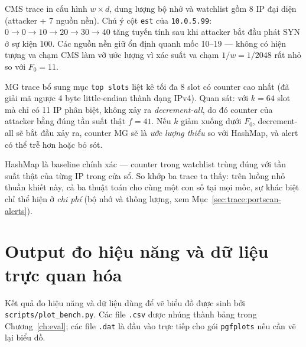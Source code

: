 \noindent CMS trace in cấu hình $w \times d$, dung lượng bộ nhớ và watchlist
gồm 8 IP đại diện (attacker + 7 nguồn nền). Chú ý cột \texttt{est} của
\texttt{10.0.5.99}: $0 \to 0 \to 10 \to 20 \to 30 \to 40$ tăng tuyến tính
sau khi attacker bắt đầu phát SYN ở sự kiện 100. Các nguồn nền giữ ổn định
quanh mốc 10--19 --- không có hiện tượng va chạm CMS làm vỡ ước lượng vì
xác suất va chạm $1/w = 1/2048$ rất nhỏ so với $F_0 = 11$.



\noindent MG trace bổ sung mục \texttt{top slots} liệt kê tối đa 8 slot có
counter cao nhất (đã giải mã ngược 4 byte little-endian thành dạng IPv4).
Quan sát: với $k = 64$ slot mà chỉ có 11 IP phân biệt, không xảy ra
\emph{decrement-all}, do đó counter của attacker bằng đúng tần suất thật
$f = 41$. Nếu $k$ giảm xuống dưới $F_0$, decrement-all sẽ bắt đầu xảy ra,
counter MG sẽ là \emph{ước lượng thiếu} so với HashMap, và alert có thể trễ
hơn hoặc bỏ sót.



\noindent HashMap là baseline chính xác --- counter trong watchlist trùng
đúng với tần suất thật của từng IP trong cửa sổ. So khớp ba trace ta thấy:
trên luồng nhỏ thuần khiết này, cả ba thuật toán cho cùng một con số tại
mọi mốc, sự khác biệt chỉ thể hiện ở \emph{chi phí} (bộ nhớ và thông lượng,
xem Mục~\ref{sec:trace:portscan-alerts}).

\section{Output đo hiệu năng và dữ liệu trực quan hóa}
\label{sec:trace:bench-output}

Kết quả đo hiệu năng và dữ liệu dùng để vẽ biểu đồ được sinh bởi
\texttt{scripts/plot\_bench.py}. Các file \texttt{.csv} được nhúng thành
bảng trong Chương~\ref{ch:eval}; các file \texttt{.dat} là đầu vào trực tiếp
cho gói \texttt{pgfplots} nếu cần vẽ lại biểu đồ.



